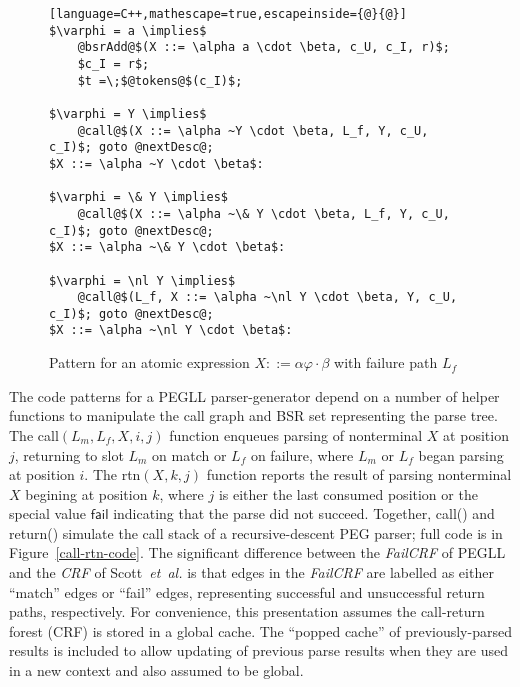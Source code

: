 \documentclass{article}
\makeatletter
\newcommand{\fail}{\mathsf{fail}}
\newcommand{\nl}{\mathord{!}}
\newcommand{\etal}{\textit{et~al.}\@}
\makeatother
\begin{document}
\begin{figure}
\caption[Atomic expression code patterns]{Pattern for an atomic expression $X ::= \alpha \varphi \cdot \beta$ with failure path $L_f$} \label{atom-expr-pattern}
\begin{lstlisting}[language=C++,mathescape=true,escapeinside={@}{@}]
$\varphi = a \implies$
	@bsrAdd@$(X ::= \alpha a \cdot \beta, c_U, c_I, r)$;
	$c_I = r$;
	$t =\;$@tokens@$(c_I)$;

$\varphi = Y \implies$
	@call@$(X ::= \alpha ~Y \cdot \beta, L_f, Y, c_U, c_I)$; goto @nextDesc@;
$X ::= \alpha ~Y \cdot \beta$:

$\varphi = \& Y \implies$
	@call@$(X ::= \alpha ~\& Y \cdot \beta, L_f, Y, c_U, c_I)$; goto @nextDesc@;
$X ::= \alpha ~\& Y \cdot \beta$:

$\varphi = \nl Y \implies$
	@call@$(L_f, X ::= \alpha ~\nl Y \cdot \beta, Y, c_U, c_I)$; goto @nextDesc@;
$X ::= \alpha ~\nl Y \cdot \beta$:
\end{lstlisting}
\end{figure}

The code patterns for a PEGLL parser-generator depend on a number of helper functions to manipulate the call graph and BSR set representing the parse tree. 
The call$(L_m, L_f, X, i, j)$ function enqueues parsing of nonterminal $X$ at position $j$, returning to slot $L_m$ on match or $L_f$ on failure, where $L_m$ or $L_f$ began parsing at position $i$. 
The rtn$(X, k, j)$ function reports the result of parsing nonterminal $X$ begining at position $k$, where $j$ is either the last consumed position or the special value $\fail$ indicating that the parse did not succeed. 
Together, call() and return() simulate the call stack of a recursive-descent PEG parser; full code is in Figure~\ref{call-rtn-code}. 
The significant difference between the \emph{FailCRF} of PEGLL and the \emph{CRF} of Scott~\etal \cite{SJvB19} is that edges in the \emph{FailCRF} are labelled as either ``match'' edges or ``fail'' edges, representing successful and unsuccessful return paths, respectively. 
For convenience, this presentation assumes the call-return forest (CRF) is stored in a global cache. 
The ``popped cache'' of previously-parsed results is included to allow updating of previous parse results when they are used in a new context and also assumed to be global.
\end{document}

